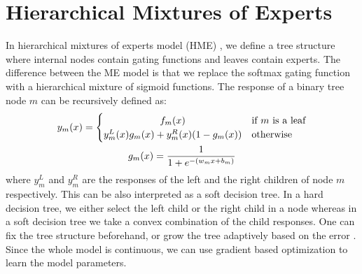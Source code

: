 \documentclass[a4paper,onesided,12pt]{report}
\begin{document}
\section{Hierarchical Mixtures of Experts}
\label{sec:hme}
In hierarchical mixtures of experts model (HME) \cite{hme}, we define a tree structure where internal nodes contain gating functions and leaves contain experts. The difference between the ME model is that we replace the softmax gating function with a hierarchical mixture of sigmoid functions. The response of a binary tree node $m$ can be recursively defined as:
\begin{gather}
y_m(x)=
	\begin{cases}
		\hfil f_m(x) &\text{if $m$ is a leaf} \\
		\hfil y_m^{L}(x)g_m(x) + y_m^{R}(x)(1 - g_m(x)) &\text{otherwise}
	\end{cases}\\
g_m(x) = \frac{1}{1+e^{-(w_m x + b_m)}}
\end{gather}
where $y_m^L$ and $y_m^R$ are the responses of the left and the right children of node $m$ respectively. This can be also interpreted as a soft decision tree. In a hard decision tree, we either select the left child or the right child in a node whereas in a soft decision tree we take a convex combination of the child responses. One can fix the tree structure beforehand, or grow the tree adaptively based on the error \cite{sdt, budding}. Since the whole model is continuous, we can use gradient based optimization to learn the model parameters.
%
\end{document}
